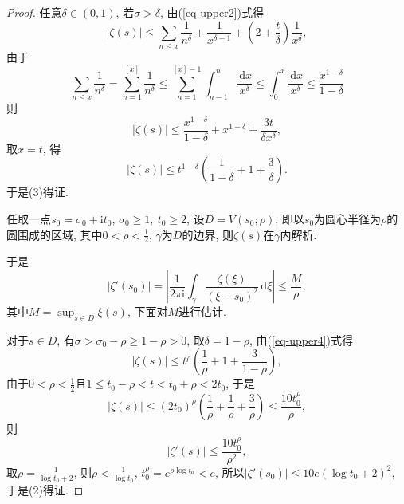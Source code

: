 \documentclass[12pt, a4paper, oneside]{ctexart}
\numberwithin{equation}{section}  %
\let\leq=\leqslant %
\let\geq=\geqslant %
\def\d{\mathrm{d}}          %
\def\i{\mathrm{i}}          %
\def\add{\vspace{1ex}}      %
\begin{document}
\begin{proof}
    任意$\delta\in (0,1)$, 若$\sigma > \delta$, 由(\ref{eq-upper2})式得
    \begin{equation*}
        |\zeta(s)|\leq \sum_{n\leq x}\frac{1}{n^{\delta}}+\frac{1}{x^{\delta-1}}+\left(2+\frac{t}{\delta}\right)\frac{1}{x^{\delta}},
    \end{equation*}
    由于
    \begin{equation*}
        \sum_{n\leq x}\frac{1}{n^{\delta}} = \sum_{n=1}^{[x]}\frac{1}{n^{\delta}}\leq \sum_{n=1}^{[x]-1}\int_{n-1}^n\frac{\,\d x}{x^{\delta}}\leq \int_0^x\frac{\,\d x}{x^{\delta}}\leq \frac{x^{1-\delta}}{1-\delta}
    \end{equation*}
    则
    \begin{equation*}
        |\zeta(s)|\leq \frac{x^{1-\delta}}{1-\delta}+x^{1-\delta}+\frac{3t}{\delta x^{\delta}},
    \end{equation*}
    取$x=t$, 得
    \begin{equation}\label{eq-upper4}
        |\zeta(s)|\leq t^{1-\delta}\left(\frac{1}{1-\delta}+1+\frac{3}{\delta}\right).
    \end{equation}
    于是(3)得证.

    任取一点$s_0 = \sigma_0+\i t_0$, $\sigma_0\geq 1,\ t_0\geq 2$, 设$D = V(s_0;\rho)$\add, 即以$s_0$为圆心半径为$\rho$的圆围成的区域, 其中$0 < \rho < \frac{1}{2}$, $\gamma$为$D$的边界, 则$\zeta(s)$在$\gamma$内解析.

    于是
    \begin{equation*}
        |\zeta'(s_0)|=\left|\frac{1}{2\pi\i}\int_{\gamma}\frac{\zeta(\xi)}{(\xi-s_0)^2}\,\d\xi\right|\leq\frac{M}{\rho},
    \end{equation*}
    其中$M = \sup_{s\in D}\xi(s)$, 下面对$M$进行估计.

    对于$s\in D$, 有$\sigma > \sigma_0 - \rho\geq 1-\rho > 0$, 取$\delta = 1-\rho$, 由(\ref{eq-upper4})式得
    \begin{equation*}
        |\zeta(s)|\leq t^{\rho}\left(\frac{1}{\rho}+1+\frac{3}{1-\rho}\right),
    \end{equation*}
    由于$0<\rho < \frac{1}{2}$且$1\leq t_0-\rho < t < t_0+\rho < 2t_0$, 于是
    \begin{equation*}
        |\zeta(s)|\leq (2t_0)^{\rho}\left(\frac{1}{\rho}+\frac{1}{\rho}+\frac{3}{\rho}\right)\leq\frac{10t_0^{\rho}}{\rho},
    \end{equation*}
    则
    \begin{equation*}
        |\zeta'(s)|\leq \frac{10t_0^{\rho}}{\rho^2},
    \end{equation*}
    取$\rho = \frac{1}{\log t_0 + 2}$, 则$\rho < \frac{1}{\log t_0}$, $t_0^{\rho} = e^{\rho\log t_0} < e$, 所以$|\zeta'(s_0)|\leq 10e(\log t_0+2)^2$, 于是(2)得证.
\end{proof}
\end{document}
